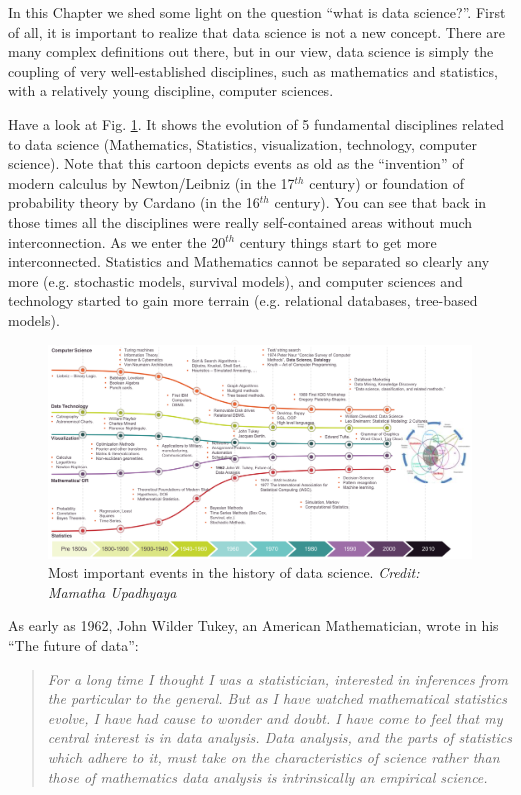 In this Chapter we shed some light on the question ``what is data science?''. First of all, it is important to realize that data science is not a new concept. There are many complex definitions out there, but in our view, data science is simply the coupling of very well-established disciplines, such as mathematics and statistics, with a relatively young discipline, computer sciences. 

Have a look at Fig. \ref{fig:Analytics}. It shows the evolution of 5 fundamental disciplines related to data science (Mathematics, Statistics, visualization, technology, computer science). Note that this cartoon depicts events as old as the ``invention'' of modern calculus by Newton/Leibniz (in the 17$^{th}$ century) or foundation of probability theory by Cardano (in the 16$^{th}$ century). You can see that back in those times all the disciplines were really self-contained areas without much interconnection. As we enter the 20$^{th}$ century things start to get more interconnected. Statistics and Mathematics cannot be separated so clearly any more (e.g. stochastic models, survival models), and computer sciences and technology started to gain more terrain (e.g. relational databases, tree-based models). 
\newpage
\begin{figure}[h]
	\begin{center}
			\includegraphics[scale=0.25]{Parts/history/HistoryCH1.png}
	\end{center}
	\caption{Most important events in the history of data science. \textit{Credit: Mamatha Upadhyaya}}
	\label{fig:Analytics}
\end{figure} 

As early as 1962, John Wilder Tukey, an American Mathematician, wrote in his ``The future of data'':
\begin{quotation}
\textit{For a long time I thought I was a statistician, interested in inferences from the particular to the general. But as I have watched mathematical statistics evolve, I have had cause to wonder and doubt. I have come to feel that my central interest is in data analysis. Data analysis, and the parts of statistics which adhere to it, must take on the characteristics of science rather than those of mathematics data analysis is intrinsically an empirical science.}
\end{quotation} 
 

